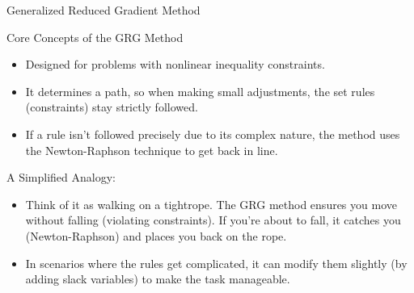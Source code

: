 \documentclass[
    NAME={Dr. Helga Ingimundardóttir},
    EMAIL={helgaingim@hi.is},
    FACULTY={Industrial Engineering},
    TITLE={Nonlinear Optimization},
    SUBTITLE={Approaches and Challenges},
    SEMINAR={VÉL113F},
    DATE={Design and Optimization}
]{../HI-latex/hi-beamer}
\begin{document}
    \begin{frame}{Generalized Reduced Gradient Method}
        \begin{block}{Core Concepts of the GRG Method}
            \begin{itemize}
                \item Designed for problems with nonlinear inequality constraints.
                \item It determines a path, so when making small adjustments, the set rules (constraints) stay strictly followed.
                \item If a rule isn't followed precisely due to its complex nature, the method uses the Newton-Raphson technique to get back in line.
            \end{itemize}
        \end{block}

        \alert{A Simplified Analogy:}
        \begin{itemize}
            \item Think of it as walking on a tightrope. The GRG method ensures you move without falling (violating
            constraints). If you're about to fall, it catches you (Newton-Raphson) and places you back on the rope.
            \item In scenarios where the rules get complicated, it can modify them slightly (by adding slack
            variables) to make the task manageable.
        \end{itemize}

    \end{frame}
\end{document}
